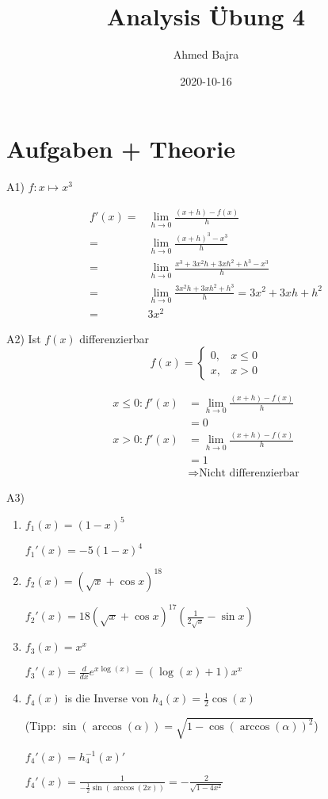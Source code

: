 \documentclass{article}
\title{Analysis Übung 4}
\author{Ahmed Bajra}
\date{2020-10-16}
\begin{document}
    \maketitle

    \section{Aufgaben + Theorie}
    A1) $f: x \mapsto x^3$

    \begin{align*}
        f'(x)=& \lim_{h\to0} \frac{(x+h)-f(x)}h\\
        =& \lim_{h\to0} \frac{(x+h)^3 - x^3}h\\
        =& \lim_{h\to0} \frac{x^3 + 3x^2h + 3xh^2 + h^3 - x^3}h\\
        =& \lim_{h\to0} \frac{3x^2h + 3xh^2 + h^3}h = 3x^2 + 3xh + h^2\\
        =& 3x^2
    \end{align*}

    A2) Ist $f(x)$ differenzierbar
    \[
        f(x)=\begin{cases}
            0, &x\leq 0\\ 
            x, &x>0
        \end{cases}
    \]

    \begin{align*}
        x\leq0: f'(x)&=\lim_{h\to0} \frac{(x+h)-f(x)}h\\ 
        &=0\\
        x>0: f'(x)&=\lim_{h\to0} \frac{(x+h)-f(x)}h\\ 
        &=1\\
        &\Rightarrow \text{Nicht differenzierbar}
    \end{align*}

    \newpage

    A3)
    \begin{enumerate}[1)]
        \item $f_1(x) = (1-x)^5$

        $f_1'(x) = -5(1-x)^4$
        \item $f_2(x) = (\sqrt{x}+\cos{x})^18$

        $f_2'(x) = 18(\sqrt{x}+\cos x)^{17} (\frac1{2\sqrt{x}}-\sin x)$
        \item $f_3(x)=x^x$

        $f_3'(x) = \frac{d}{dx}e^{x\log(x)} = (\log(x)+1)x^x$
        \item $f_4(x)$ is die Inverse von $h_4(x)=\frac12 \cos(x)$

        (Tipp: $\sin(\arccos(\alpha))=\sqrt{1-\cos(\arccos(\alpha))^2}$)

        $f_4'(x)= h_4^{-1}(x)'$

        $f_4'(x)=\frac1{-\frac12\sin(\arccos(2x))}=-\frac2{\sqrt{1-4x^2}}$
    \end{enumerate}
\end{document}
